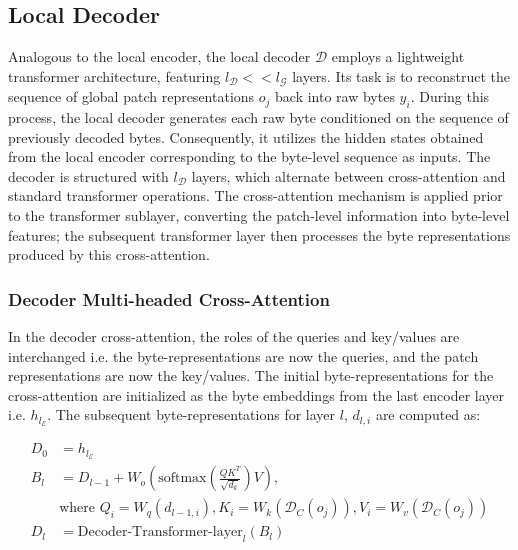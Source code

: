 \subsection{Local Decoder} 

Analogous to the local encoder, the local decoder $\mathcal{D}$ employs a lightweight transformer architecture, featuring $l_{\mathcal{D}} << l_{\mathcal{G}}$ layers. Its task is to reconstruct the sequence of global patch representations $o_j$ back into raw bytes $y_i$. During this process, the local decoder generates each raw byte conditioned on the sequence of previously decoded bytes. Consequently, it utilizes the hidden states obtained from the local encoder corresponding to the byte-level sequence as inputs. The decoder is structured with $l_{\mathcal{D}}$ layers, which alternate between cross-attention and standard transformer operations. The cross-attention mechanism is applied prior to the transformer sublayer, converting the patch-level information into byte-level features; the subsequent transformer layer then processes the byte representations produced by this cross-attention.

\subsubsection{Decoder Multi-headed Cross-Attention} 

In the decoder cross-attention, the roles of the queries and key/values are interchanged i.e. the byte-representations are now the queries, and the patch representations are now the key/values. The initial byte-representations for the cross-attention are initialized as the byte embeddings from the last encoder layer i.e. $h_{l_{\mathcal{E}}}$. The subsequent byte-representations for layer $l$, $d_{l,i}$ are computed as:

\begin{align}
D_0 &= h_{l_{\mathcal{E}}} \\
B_l &= D_{l-1} + W_o\left(\text{softmax}\left(\frac{QK^T}{\sqrt{d_k}}\right)V\right), \\
  &\text{where } Q_i = W_q(d_{l-1,i}), K_i = W_k(\mathcal{D}_C(o_j)), V_i = W_v(\mathcal{D}_C(o_j)) \\
  D_l &= \text{Decoder-Transformer-layer}_l(B_l)
\end{align}

